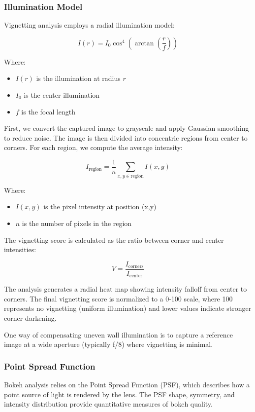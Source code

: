 \subsubsection{Illumination Model}
Vignetting analysis employs a radial illumination model:

\begin{equation}
I(r) = I_0 \cos^4\left(\arctan\left(\frac{r}{f}\right)\right)
\end{equation}

Where:
\begin{itemize}
    \item \( I(r) \) is the illumination at radius \( r \)
    \item \( I_0 \) is the center illumination
    \item \( f \) is the focal length
\end{itemize}


First, we convert the captured image to grayscale and apply Gaussian smoothing to reduce noise. The image is then divided into concentric regions from center to corners. For each region, we compute the average intensity:

\begin{equation}
I_{\text{region}} = \frac{1}{n} \sum_{x,y \in \text{region}} I(x,y)
\end{equation}

Where:
\begin{itemize}
    \item \( I(x,y) \) is the pixel intensity at position (x,y)
    \item \( n \) is the number of pixels in the region
\end{itemize}

The vignetting score is calculated as the ratio between corner and center intensities:

\begin{equation}
V = \frac{I_{\text{corners}}}{I_{\text{center}}}
\end{equation}

The analysis generates a radial heat map showing intensity falloff from center to corners. The final vignetting score is normalized to a 0-100 scale, where 100 represents no vignetting (uniform illumination) and lower values indicate stronger corner darkening.

One way of compensating uneven wall illumination is to capture a reference image at a wide aperture (typically f/8) where vignetting is minimal.


\subsubsection{Point Spread Function}
Bokeh analysis relies on the Point Spread Function (PSF), which describes how a point source of light is rendered by the lens. The PSF shape, symmetry, and intensity distribution provide quantitative measures of bokeh quality.


